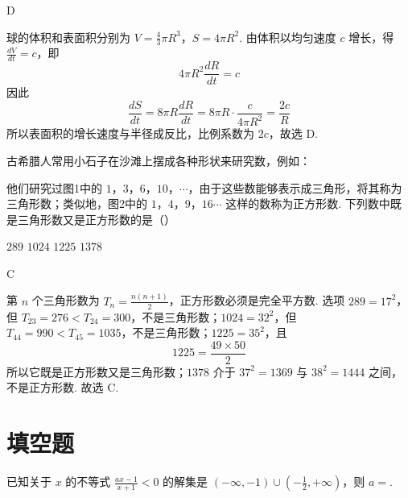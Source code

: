 \begin{answer}
D
\end{answer}

\begin{solution}
球的体积和表面积分别为 \(V=\frac43\pi R^3\)，\(S=4\pi R^2\). 由体积以均匀速度 \(c\) 增长，得 \(\frac{dV}{dt}=c\)，即
\[
4\pi R^2\frac{dR}{dt}=c
\]
因此
\[
\frac{dS}{dt}=8\pi R\frac{dR}{dt}=8\pi R\cdot\frac{c}{4\pi R^2}=\frac{2c}{R}
\]
所以表面积的增长速度与半径成反比，比例系数为 \(2c\)，故选 D.
\end{solution}

\begin{problem}
古希腊人常用小石子在沙滩上摆成各种形状来研究数，例如：

他们研究过图1中的 \(1\)，\(3\)，\(6\)，\(10\)，\(\cdots\)，由于这些数能够表示成三角形，将其称为三角形数；类似地，图2中的 \(1\)，\(4\)，\(9\)，\(16\cdots\) 这样的数称为正方形数. 下列数中既是三角形数又是正方形数的是（\quad）

\problemresetlayout
{}

\choices
    {\(289\)}
    {\(1024\)}
    {\(1225\)}
    {\(1378\)}
\end{problem}

\begin{answer}
C
\end{answer}

\begin{solution}
第 \(n\) 个三角形数为 \(T_n=\frac{n(n+1)}2\)，正方形数必须是完全平方数. 选项 \(289=17^2\)，但 \(T_{23}=276<T_{24}=300\)，不是三角形数；\(1024=32^2\)，但 \(T_{44}=990<T_{45}=1035\)，不是三角形数；\(1225=35^2\)，且
\[
1225=\frac{49\times50}{2}
\]
所以它既是正方形数又是三角形数；\(1378\) 介于 \(37^2=1369\) 与 \(38^2=1444\) 之间，不是正方形数. 故选 C.
\end{solution}

\section{填空题}

\begin{problem}
已知关于 \(x\) 的不等式 \(\frac{ax - 1}{x + 1} < 0\) 的解集是 \((-\infty, -1) \cup \left(-\frac{1}{2}, +\infty\right)\)，则 \(a = \)\fillinblank{}.
\end{problem}

